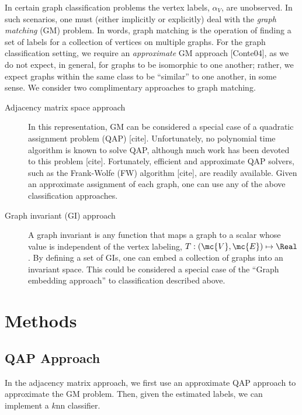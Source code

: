In certain graph classification problems the vertex labels, $\alpha_V$, are unobserved.  In such scenarios, one must (either implicitly or explicitly) deal with the \emph{graph matching} (GM) problem.  In words, graph matching is the operation of finding a set of labels for a collection of vertices on multiple graphs.  For the graph classification setting, we require an \emph{approximate} GM approach [Conte04], as we do not expect, in general, for graphs to be isomorphic to one another; rather, we expect graphs within the same class to be ``similar'' to one another, in some sense.  We consider two complimentary approaches to graph matching.
\begin{description}
	\item[Adjacency matrix space approach]  In this representation, GM can be considered a special case of a quadratic assignment problem (QAP) [cite].   Unfortunately, no polynomial time algorithm is known to solve QAP, although much work has been devoted to this problem [cite]. Fortunately, efficient and approximate QAP solvers, such as the Frank-Wolfe (FW) algorithm [cite], are readily available.  Given an approximate assignment of each graph, one can use any of the above classification approaches.
	\item[Graph invariant (GI) approach] A graph invariant is any function that maps a graph to a scalar whose value is independent of the vertex labeling, $T: (\mc{V},\mc{E}) \mapsto \Real$.  By defining a set of GIs, one can embed a collection of graphs into an invariant space.  This could be considered a special case of the ``Graph embedding approach'' to classification described above.		
\end{description}



\section{Methods} %
\label{sec:methods}

\subsection{QAP Approach} %
\label{sec:quadratic_assignment_problem}

In the adjacency matrix approach, we first use an approximate QAP approach to approximate the GM problem.  Then, given the estimated labels, we can implement a $k$nn classifier. 

